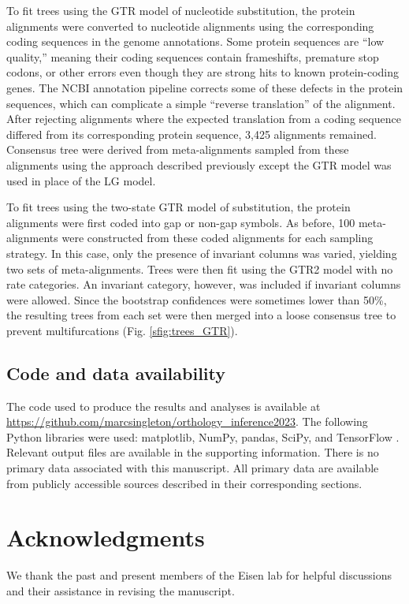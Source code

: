 \documentclass[10pt,letterpaper]{article}
\begin{document}
To fit trees using the GTR model of nucleotide substitution, the protein alignments were converted to nucleotide alignments using the corresponding coding sequences in the genome annotations. Some protein sequences are “low quality,” meaning their coding sequences contain frameshifts, premature stop codons, or other errors even though they are strong hits to known protein-coding genes. The NCBI annotation pipeline corrects some of these defects in the protein sequences, which can complicate a simple “reverse translation” of the alignment. After rejecting alignments where the expected translation from a coding sequence differed from its corresponding protein sequence, 3,425 alignments remained. Consensus tree were derived from meta-alignments sampled from these alignments using the approach described previously except the GTR model was used in place of the LG model.

To fit trees using the two-state GTR model of substitution, the protein alignments were first coded into gap or non-gap symbols. As before, 100 meta-alignments were constructed from these coded alignments for each sampling strategy. In this case, only the presence of invariant columns was varied, yielding two sets of meta-alignments. Trees were then fit using the GTR2 model with no rate categories. An invariant category, however, was included if invariant columns were allowed. Since the bootstrap confidences were sometimes lower than 50\%, the resulting trees from each set were then merged into a loose consensus tree to prevent multifurcations (Fig. \ref{sfig:trees_GTR}).

\subsection*{Code and data availability}
The code used to produce the results and analyses is available at \url{https://github.com/marcsingleton/orthology_inference2023}. The following Python libraries were used: matplotlib, NumPy, pandas, SciPy, and TensorFlow \cite{Hunter2007, Harris2020, McKinney2010, Virtanen2020, Abadi2015}. Relevant output files are available in the supporting information. There is no primary data associated with this manuscript. All primary data are available from publicly accessible sources described in their corresponding sections.

\section*{Acknowledgments}
We thank the past and present members of the Eisen lab for helpful discussions and their assistance in revising the manuscript.
\end{document}
